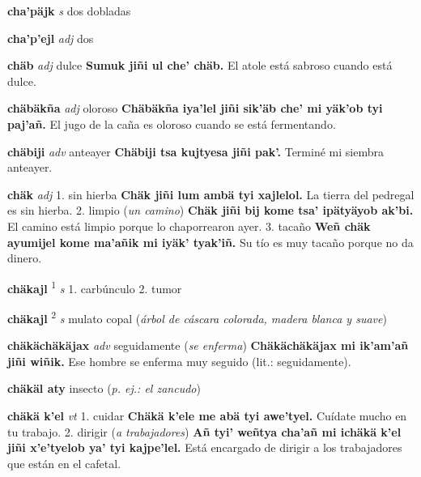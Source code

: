 \documentclass[10pt]{scrbook}
\newcommand{\entry}[1]{\textbf{#1}}
\newcommand{\onedefinition}[1]{#1.}
\newcommand{\defsuperscript}[1]{\textsuperscript{#1}}
\newcommand{\partofspeech}[1]{\textit{#1}}
\newcommand{\spanishtranslation}[1]{#1}
\newcommand{\clarification}[1]{(\textit{#1})}
\newcommand{\cholexample}[1]{\textbf{#1}}
\newcommand{\exampletranslation}[1]{#1}
\newcommand{\secondtranslation}[1]{#1}
\begin{document}
\begin{multicols}{2}
\entry{cha'päjk}
\partofspeech{s}
\spanishtranslation{dos dobladas}

\entry{cha'p'ejl}
\partofspeech{adj}
\spanishtranslation{dos}

\entry{chäb}
\partofspeech{adj}
\spanishtranslation{dulce}
\cholexample{Sumuk jiñi ul che' chäb.}
\exampletranslation{El atole está sabroso cuando está dulce.}

\entry{chäbäkña}
\partofspeech{adj}
\spanishtranslation{oloroso}
\cholexample{Chäbäkña iya'lel jiñi sik'äb che' mi yäk'ob tyi paj'añ.}
\exampletranslation{El jugo de la caña es oloroso cuando se está fermentando.}

\entry{chäbiji}
\partofspeech{adv}
\spanishtranslation{anteayer}
\cholexample{Chäbiji tsa kujtyesa jiñi pak'.}
\exampletranslation{Terminé mi siembra anteayer.}

\entry{chäk}
\partofspeech{adj}
\onedefinition{1}
\spanishtranslation{sin hierba}
\cholexample{Chäk jiñi lum ambä tyi xajlelol.}
\exampletranslation{La tierra del pedregal es sin hierba.}
\onedefinition{2}
\spanishtranslation{limpio}
\clarification{un camino}
\cholexample{Chäk jiñi bij kome tsa' ipätyäyob ak'bi.}
\exampletranslation{El camino está limpio porque lo chaporrearon ayer.}
\onedefinition{3}
\secondtranslation{tacaño}
\cholexample{Weñ chäk ayumijel kome ma'añik mi iyäk' tyak'iñ.}
\exampletranslation{Su tío es muy tacaño porque no da dinero.}

\entry{chäkajl}
\defsuperscript{1}
\partofspeech{s}
\onedefinition{1}
\spanishtranslation{carbúnculo}
\onedefinition{2}
\spanishtranslation{tumor}

\entry{chäkajl}
\defsuperscript{2}
\partofspeech{s}
\spanishtranslation{mulato}
\spanishtranslation{copal}
\clarification{árbol de cáscara colorada, madera blanca y suave}

\entry{chäkächäkäjax}
\partofspeech{adv}
\spanishtranslation{seguidamente}
\clarification{se enferma}
\cholexample{Chäkächäkäjax mi ik'am'añ jiñi wiñik.}
\exampletranslation{Ese hombre se enferma muy seguido (lit.: seguidamente).}

\entry{chäkäl aty}
\spanishtranslation{insecto}
\clarification{p. ej.: el zancudo}

\entry{chäkä k'el}
\partofspeech{vt}
\onedefinition{1}
\spanishtranslation{cuidar}
\cholexample{Chäkä k'ele me abä tyi awe'tyel.}
\exampletranslation{Cuídate mucho en tu trabajo.}
\onedefinition{2}
\spanishtranslation{dirigir}
\clarification{a trabajadores}
\cholexample{Añ tyi' weñtya cha'añ mi ichäkä k'el jiñi x'e'tyelob ya' tyi kajpe'lel.}
\exampletranslation{Está encargado de dirigir a los trabajadores que están en el cafetal.}


\end{multicols}
\end{document}
